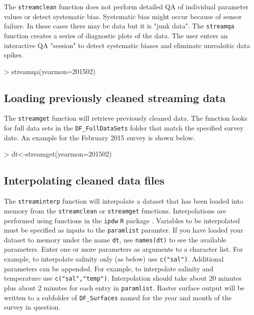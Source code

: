 \documentclass[12pt]{article}
\begin{document}
The \texttt{streamclean} function does not perform detailed QA of individual parameter values or detect systematic bias. Systematic bias might occur because of sensor failure. In these cases there may be data but it is "junk data". The \texttt{streamqa} function creates a series of diagnostic plots of the data. The user enters an interactive QA "session" to detect systematic biases and eliminate unrealsitic data spikes.

\begin{Schunk}
\begin{Sinput}
> streamqa(yearmon=201502)
\end{Sinput}
\end{Schunk}


\subsection{Loading previously cleaned streaming data}

The \texttt{streamget} function will retrieve previously cleaned data. The function looks for full data sets in the \verb|DF_FullDataSets| folder that match the specified survey date. An example for the February 2015 survey is shown below.


\begin{Schunk}
\begin{Sinput}
> dt<-streamget(yearmon=201502)
\end{Sinput}
\end{Schunk}

\subsection{Interpolating cleaned data files}

The \texttt{streaminterp} function will interpolate a dataset that has been loaded into memory from the \texttt{streamclean} or \texttt{streamget} functions. Interpolations are performed using functions in the \texttt{ipdw} \texttt{R} package \citep{ipdw}. Variables to be interpolated must be specified as inputs to the \texttt{paramlist} paramter. If you have loaded your dataset to memory under the name \texttt{dt}, use \texttt{names(dt)} to see the available parameters. Enter one or more parameters as arguments to a character list. For example, to interpolate salinity only (as below) use \texttt{c("sal")}. Additional parameters can be appended. For example, to interpolate salinity and temperature use \texttt{c("sal","temp")}. Interpolation should take about 20 minutes plus about 2 minutes for each entry in \texttt{paramlist}. Raster surface output will be written to a subfolder of \verb|DF_Surfaces| named for the year and month of the survey in question.\\
\end{document}
